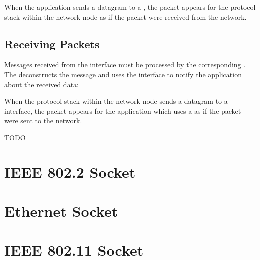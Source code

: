 
When the application sends a datagram to a , the packet
appears for the protocol stack within the network node as if the packet were
received from the network.

\subsection*{Receiving Packets}

Messages received from the  interface must be processed by the
corresponding . The  deconstructs the
message and uses the  interface to notify the
application about the received data:


When the protocol stack within the network node sends a datagram to a
 interface, the packet appears for the application which uses a
 as if the packet were sent to the network.



\ifdraft TODO
\section{IEEE 802.2 Socket}

\section{Ethernet Socket}

\section{IEEE 802.11 Socket}
\fi
